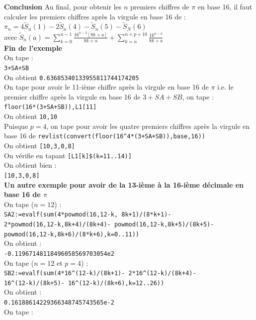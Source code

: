 \documentclass[a4paper,11pt]{book}
\begin{document}
{\bf Conclusion}
Au final, pour obtenir les $n$ premiers chiffres de $\pi$ en base 16, il
faut calculer les premiers chiffres apr\`es la virgule en base 16 de :\\
$\pi_n=4\tilde{S}_n(1)-2\tilde{S}_n(4)-\tilde{S}_n(5)-\tilde{S}_N(6)$\\
avec $\displaystyle \tilde{S}_n(a)=\sum_{k=0}^{n-1} \frac{16^{n-k}[8k+a]}{8k+a}+\sum_{k=n}^{n+p+10} \frac{16^{n-k}}{8k+a}$\\
{\bf Fin de l'exemple}\\
On tape :\\
{\tt 3+SA+SB}\\
On obtient
{\tt 0.63685340133955811744174205}\\
On tape pour avoir le 11-i\`eme chiffre apr\`es la virgule en base 16 de $\pi$ i.e. le premier chiffre apr\`es la virgule en base 16 de $3+SA+SB$, on tape :\\
{\tt floor(16*(3+SA+SB)),L1[11]}\\
On obtient
{\tt 10,10}\\
Puisque $p=4$, on tape pour avoir les quatre premiers chiffres apr\`es la virgule en base 16 de
{\tt revlist(convert(floor(16\verb|^|4*(3+SA+SB)),base,16))}\\
On obtient
{\tt [10,3,0,8]}\\
On v\'erifie en tapant {\tt [L1[k]\$(k=11..14)]}\\
On obtient bien :\\
{\tt [10,3,0,8]}\\
{\bf Un autre exemple pour avoir de la 13-i\`eme \`a la 16-i\`eme d\'ecimale en base 16 de $\pi$}\\
On tape ($n=12$) :\\
{\tt SA2:=evalf(sum(4*powmod(16,12-k, 8k+1)/(8*k+1)-\\
2*powmod(16,12-k,8k+4)/(8k+4)-
powmod(16,12-k,8k+5)/(8k+5)-
powmod(16,12-k,8k+6)/(8*k+6),k=0..11))}\\
On obtient :\\
{\tt -0.11967148118496058569703054e2}\\
On tape ($n=12$ et $p=4$) :\\
{\tt SB2:=evalf(sum(4*16\verb|^|(12-k)/(8k+1)-
2*16\verb|^|(12-k)/(8k+4)-\\
16\verb|^|(12-k)/(8k+5)-
16\verb|^|(12-k)/(8k+6),k=12..26))}\\
On obtient :\\
{\tt 0.16188614229366348745743565e-2}\\
On tape :\\
\end{document}

